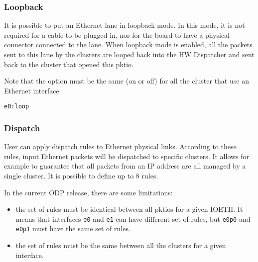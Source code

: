 \documentclass{trkalray}
\begin{document}
\subsubsection{Loopback}

It is possible to put an Ethernet lane in loopback mode. In this mode,
it is not required for a cable to be plugged in, nor for the board to
have a physical connector connected to the lane.
When loopback mode is enabled, all the packets sent to this lane by
the clusters are looped back into the HW Dispatcher and sent back to
the cluster that opened this pktio.

Note that the option must be the same (on or off) for all the cluster
that use an Ethernet interface

\begin{lstlisting}
e0:loop
\end{lstlisting}

\subsubsection{Dispatch}

User can apply dispatch rules to Ethernet physical links. According to
these rules, input Ethernet packets will be dispatched to specific
clusters. It allows for example to guarantee that all packets from an IP
address are all managed by a single cluster. It is possible to define up
to 8 rules.

In the current ODP release, there are some limitations:
\begin{itemize}
	\item the set of rules must be identical between all pktios for a
		given IOETH. It means that interfaces \texttt{e0} and
		\texttt{e1} can have different set of rules, but \texttt{e0p0}
		and \texttt{e0p1} must have the same set of rules.
	\item the set of rules must be the same between all the clusters for
		a given interface.
\end{itemize}
\end{document}
